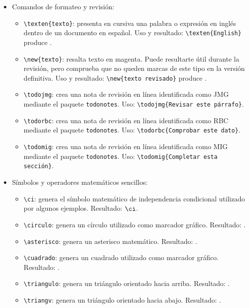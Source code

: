 \begin{itemize}
  \item Comandos de formateo y revisión:
  \begin{itemize}
    \item \texttt{\textbackslash{}texten\{texto\}}: presenta en cursiva una palabra o expresión en inglés dentro de un documento en español. Uso y resultado: \texttt{\textbackslash{}texten\{English\}} produce .
    \item \texttt{\textbackslash{}new\{texto\}}: resalta texto en magenta. Puede resultarte útil durante la revisión, pero comprueba que no queden marcas de este tipo en la versión definitiva. Uso y resultado: \texttt{\textbackslash{}new\{texto revisado\}} produce .
    \item \texttt{\textbackslash{}todojmg}: crea una nota de revisión en línea identificada como JMG mediante el paquete \texttt{todonotes}. Uso: \texttt{\textbackslash{}todojmg\{Revisar este párrafo\}}.
    \item \texttt{\textbackslash{}todorbc}: crea una nota de revisión en línea identificada como RBC mediante el paquete \texttt{todonotes}. Uso: \texttt{\textbackslash{}todorbc\{Comprobar este dato\}}.
    \item \texttt{\textbackslash{}todomig}: crea una nota de revisión en línea identificada como MIG mediante el paquete \texttt{todonotes}. Uso: \texttt{\textbackslash{}todomig\{Completar esta sección\}}.
  \end{itemize}
  \item Símbolos y operadores matemáticos sencillos:
  \begin{itemize}
    \item \texttt{\textbackslash{}ci}: genera el símbolo matemático de independencia condicional utilizado por algunos ejemplos. Resultado: \(\ci\).
    \item \texttt{\textbackslash{}circulo}: genera un círculo utilizado como marcador gráfico. Resultado: {\circulo}.
    \item \texttt{\textbackslash{}asterisco}: genera un asterisco matemático. Resultado: {\asterisco}.
    \item \texttt{\textbackslash{}cuadrado}: genera un cuadrado utilizado como marcador gráfico. Resultado: {\cuadrado}.
    \item \texttt{\textbackslash{}triangulo}: genera un triángulo orientado hacia arriba. Resultado: {\triangulo}.
    \item \texttt{\textbackslash{}triangv}: genera un triángulo orientado hacia abajo. Resultado: {\triangv}.

\end{itemize}
\end{itemize}
